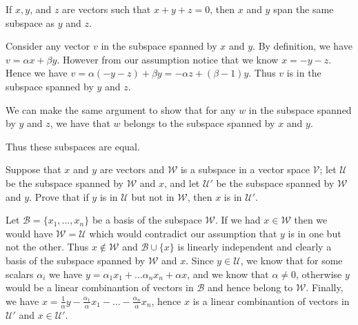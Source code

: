 \begin{problem}
  If $x, y$, and $z$ are vectors such that $x + y + z = 0$, then $x$ and $y$ span the same subspace as $y$ and $z$.
\end{problem}

\begin{solution}
  Consider any vector $v$ in the subspace spanned by $x$ and $y$.
  By definition, we have $v = \alpha x + \beta y$.
  However from our assumption notice that we know $x = - y - z$.
  Hence we have $v = \alpha (- y - z) + \beta y = - \alpha z + (\beta - 1) y$.
  Thus $v$ is in the subspace spanned by $y$ and $z$.

  We can make the same argument to show that for any $w$ in the subspace spanned by $y$ and $z$, we have that $w$ belongs to the subspace spanned by $x$ and $y$.

  Thus these subspaces are equal.
\end{solution}

\begin{problem}
  Suppose that $x$ and $y$ are vectors and $\mathcal{W}$ is a subspace in a vector space $\mathcal{V}$;
  let $\mathcal{U}$ be the subspace spanned by $\mathcal{W}$ and $x$, and let $\mathcal{U'}$ be the subspace spanned by $\mathcal{W}$ and $y$.
  Prove that if $y$ is in $\mathcal{U}$ but not in $\mathcal{W}$, then $x$ is in $\mathcal{U'}$.
\end{problem}

\begin{solution}
  Let $\mathcal{B} = \{x_1 , \ldots, x_n\}$ be a basis of the subspace $\mathcal{W}$.
  If we had $x \in \mathcal{W}$ then we would have $\mathcal{W} = \mathcal{U}$ which would contradict our assumption that $y$ is in one but not the other.
  Thus $x \notin \mathcal{W}$ and $\mathcal{B} \cup \{x\}$ is linearly independent and clearly a basis of the subspace spanned by $\mathcal{W}$ and $x$.
  Since $y \in \mathcal{U}$, we know that for some scalars $\alpha_i$ we have $y = \alpha_1 x_1 + \ldots \alpha_n x_n + \alpha x$, and we know that $\alpha \neq 0$, otherwise $y$ would be a linear combinantion of vectors in $\mathcal{B}$ and hence belong to $\mathcal{W}$.
  Finally, we have $x = \frac{1}{\alpha} y - \frac{\alpha_1}{\alpha} x_1 - \ldots - \frac{\alpha_n}{\alpha} x_n$, hence $x$ is a linear combinantion of vectors in $\mathcal{U'}$ and $x \in \mathcal{U'}$.
\end{solution}
